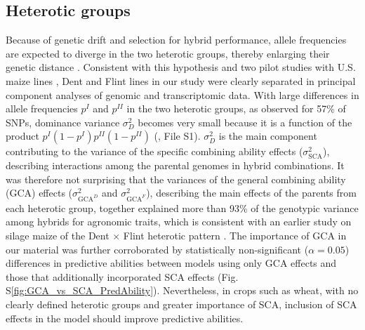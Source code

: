 \documentclass[12pt,titlepage]{article}
\begin{document}
\subsection{Heterotic groups}
Because of genetic drift and selection for hybrid performance, allele
frequencies are expected to diverge in the two heterotic groups, thereby
enlarging their genetic distance \cite{Falconer1996,Reif2007,Lariepe2017}.
Consistent with this hypothesis and two pilot studies with U.S. maize lines
\cite{Gerke2015,Hall2016}, Dent and Flint lines in our study were clearly 
separated in principal component analyses of genomic and transcriptomic data.
With large differences in allele frequencies $p^{I}$ and $p^{II}$ in the two
heterotic groups, as observed for 57\% of SNPs, dominance variance
$\sigma_{D}^{2}$ becomes very small because it is a function of the product
$p^{I} ( 1 - p^{I} ) p^{II} ( 1 - p^{II} )$ (,
File S1).
$\sigma_{D}^{2}$ is the main component contributing to the variance of 
the specific combining ability  effects ($\sigma_{\text{SCA}}^{2}$), describing 
interactions among the parental genomes in hybrid combinations.
It was therefore not surprising that the variances of the general combining
ability (GCA) effects ($\sigma_{\text{GCA}^{D}}^{2}$ and 
$\sigma_{\text{GCA}^{F}}^{2}$), describing the main effects of the parents from 
each heterotic group, together explained more than 93\% of the genotypic 
variance among hybrids for agronomic traits, which is consistent with an earlier
study on silage maize of the Dent $\times$ Flint heterotic pattern
\cite{Argillier2000}.
The importance of GCA in our material was further corroborated by statistically 
non-significant ($\alpha = 0.05$) differences in predictive abilities between 
models using only GCA effects and those that additionally incorporated SCA 
effects (Fig. S\ref{fig:GCA_vs_SCA_PredAbility}).
Nevertheless, in crops such as wheat, with no clearly defined heterotic groups
\cite{Zhao2015a} and greater importance of SCA, inclusion of SCA effects in
the model should improve predictive abilities.
\end{document}
